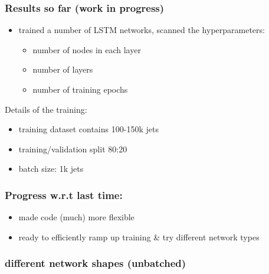 \documentclass{beamer}
\begin{document}
\begin{frame}
  \frametitle{Results so far (work in progress)}
  \begin{itemize}
  \item trained a number of LSTM networks, scanned the hyperparameters:
    \begin{itemize}
    \item number of nodes in each layer
    \item number of layers
    \item number of training epochs
    \end{itemize}
  \end{itemize}
  
  Details of the training:
  \begin{itemize}
  \item training dataset contains 100-150k jets
  \item training/validation split 80:20
  \item batch size: 1k jets
  \end{itemize}
\end{frame}

\begin{frame}
  \frametitle{Progress w.r.t last time:}
  \begin{itemize}
    \item made code (much) more flexible
    \item ready to efficiently ramp up training & try different network types
  \end{itemize}
\end{frame}

\begin{frame}
  \frametitle{different network shapes (unbatched)}

    \begin{figure}[htb]
    \centering
  \end{figure}

\end{frame}
\end{document}
